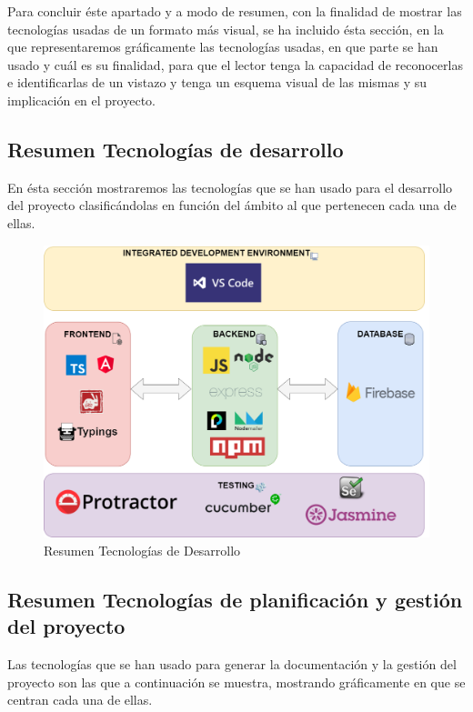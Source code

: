 \documentclass[11pt,openany]{book}
\begin{document}
Para concluir éste apartado y a modo de resumen, con la finalidad de mostrar las tecnologías usadas de un formato más visual, se ha incluido ésta sección, en la que representaremos gráficamente las tecnologías usadas, en que parte se han usado y cuál es su finalidad, para que el lector tenga la capacidad de reconocerlas e identificarlas de un vistazo y tenga un esquema visual de las mismas y su implicación en el proyecto.

\subsection{Resumen Tecnologías de desarrollo}

En ésta sección mostraremos las tecnologías que se han usado para el desarrollo del proyecto clasificándolas en función del ámbito al que pertenecen cada una de ellas.

\begin{figure}[H]
\centering
\includegraphics[totalheight=8cm]{resumenTecnologias/Resumen_Tecnolog_as_de_Desarrollo.png}
\caption{Resumen Tecnologías de Desarrollo}
\end{figure}
\vspace{-5mm}

\pagebreak
\subsection{Resumen Tecnologías de planificación y gestión del proyecto}

Las tecnologías que se han usado para generar la documentación y la gestión del proyecto son las que a continuación se muestra, mostrando gráficamente en que se centran cada una de ellas.
\end{document}
